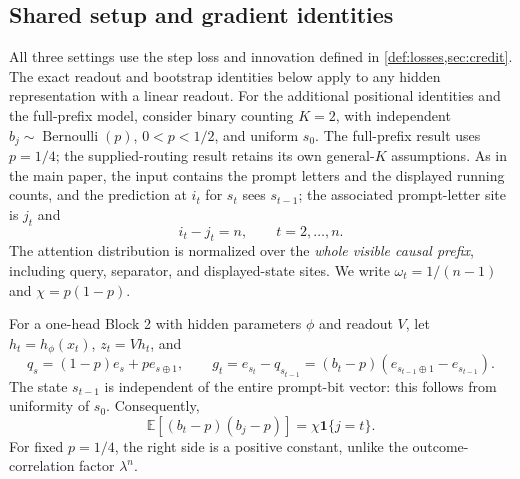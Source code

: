 \providecommand{\LRstep}{L_{\mathrm{step}}}
\providecommand{\LRout}{L_{\mathrm{out}}}
\providecommand{\LRsig}{\sigma}
\providecommand{\LRnorm}[1]{\left\lVert #1\right\rVert}
\providecommand{\LRinner}[2]{\left\langle #1,#2\right\rangle}
\theoremstyle{plain}
\newtheorem{lrlemma}[lemma]{Lemma}
\newtheorem{lrproposition}[proposition]{Proposition}
\newtheorem{lrtheorem}[theorem]{Theorem}
\newtheorem{lrremark}[remark]{Remark}

\subsection{Shared setup and gradient identities}
\label{app:weak-routing-initial}

All three settings use the step loss and innovation defined in
\cref{def:losses,sec:credit}. The exact readout and bootstrap identities below
apply to any hidden representation with a linear readout. For the additional
positional identities and the full-prefix model, consider binary counting
$K=2$, with independent
$b_j\sim\operatorname{Bernoulli}(p)$, $0<p<1/2$, and uniform $s_0$.
The full-prefix result uses $p=1/4$; the supplied-routing result retains
its own general-$K$ assumptions. As in the main paper, the input
contains the prompt letters and the displayed running counts, and the
prediction at $i_t$ for $s_t$ sees $s_{t-1}$; the associated prompt-letter
site is $j_t$ and
\begin{equation}\label{eq:lr-constant-lag}
 i_t-j_t=n,\qquad t=2,\ldots,n.
\end{equation}
The attention distribution is normalized over the \emph{whole visible causal
prefix}, including query, separator, and displayed-state sites.  We write
$\omega_t=1/(n-1)$ and $\chi=p(1-p)$.

For a one-head Block 2 with hidden parameters $\phi$ and readout
$V$, let $h_t=h_\phi(x_t)$, $z_t=Vh_t$, and
\begin{equation}
 q_s=(1-p)e_s+pe_{s\oplus1},\qquad
 g_t=e_{s_t}-q_{s_{t-1}}=(b_t-p)(e_{s_{t-1}\oplus1}-e_{s_{t-1}}).
\end{equation}
The state $s_{t-1}$ is independent of the entire prompt-bit vector: this
follows from uniformity of $s_0$.  Consequently,
\begin{equation}\label{eq:lr-innovation-cov}
 \mathbb E[(b_t-p)(b_j-p)]=\chi\mathbf 1\{j=t\}.
\end{equation}
For fixed $p=1/4$, the right side is a positive constant, unlike the
outcome-correlation factor $\lambda^n$.

